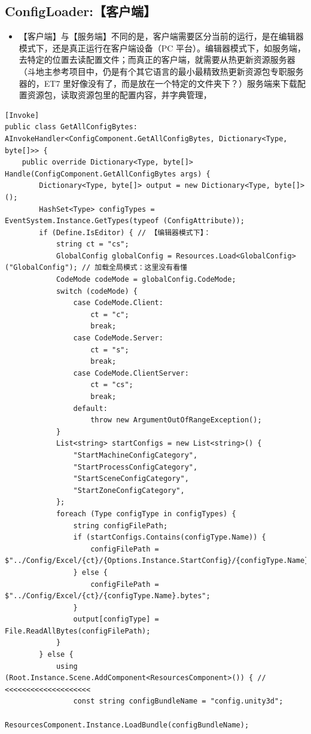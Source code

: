 \documentclass[9pt, b5paper]{article}
\begin{document}
\subsection{ConfigLoader:【客户端】}
\label{sec-1-6}
\begin{itemize}
\item 【客户端】与【服务端】不同的是，客户端需要区分当前的运行，是在编辑器模式下，还是真正运行在客户端设备（PC 平台）。编辑器模式下，如服务端，去特定的位置去读配置文件；而真正的客户端，就需要从热更新资源服务器（斗地主参考项目中，仍是有个其它语言的最小最精致热更新资源包专职服务器的，ET7 里好像没有了，而是放在一个特定的文件夹下？）服务端来下载配置资源包，读取资源包里的配置内容，并字典管理，
\end{itemize}
\begin{verbatim}
[Invoke]
public class GetAllConfigBytes: AInvokeHandler<ConfigComponent.GetAllConfigBytes, Dictionary<Type, byte[]>> {
    public override Dictionary<Type, byte[]> Handle(ConfigComponent.GetAllConfigBytes args) {
        Dictionary<Type, byte[]> output = new Dictionary<Type, byte[]>();
        HashSet<Type> configTypes = EventSystem.Instance.GetTypes(typeof (ConfigAttribute));
        if (Define.IsEditor) { // 【编辑器模式下】：
            string ct = "cs";
            GlobalConfig globalConfig = Resources.Load<GlobalConfig>("GlobalConfig"); // 加载全局模式：这里没有看懂
            CodeMode codeMode = globalConfig.CodeMode;
            switch (codeMode) {
                case CodeMode.Client:
                    ct = "c";
                    break;
                case CodeMode.Server:
                    ct = "s";
                    break;
                case CodeMode.ClientServer:
                    ct = "cs";
                    break;
                default:
                    throw new ArgumentOutOfRangeException();
            }
            List<string> startConfigs = new List<string>() {
                "StartMachineConfigCategory", 
                "StartProcessConfigCategory", 
                "StartSceneConfigCategory", 
                "StartZoneConfigCategory",
            };
            foreach (Type configType in configTypes) {
                string configFilePath;
                if (startConfigs.Contains(configType.Name)) {
                    configFilePath = $"../Config/Excel/{ct}/{Options.Instance.StartConfig}/{configType.Name}.bytes";    
                } else {
                    configFilePath = $"../Config/Excel/{ct}/{configType.Name}.bytes";
                }
                output[configType] = File.ReadAllBytes(configFilePath);
            }
        } else {
            using (Root.Instance.Scene.AddComponent<ResourcesComponent>()) { // <<<<<<<<<<<<<<<<<<<< 
                const string configBundleName = "config.unity3d";
                ResourcesComponent.Instance.LoadBundle(configBundleName);


\end{verbatim}
\end{document}
